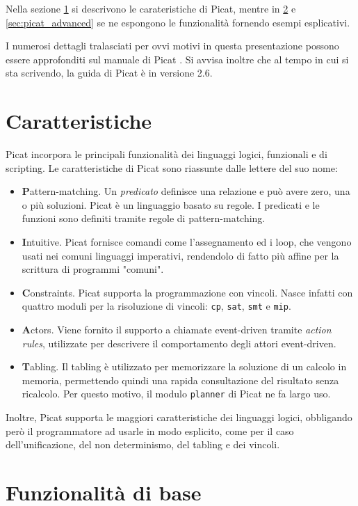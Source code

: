 \documentclass[12pt,a4paper,openright]{book} %
\begin{document}
Nella sezione \ref{sec:picat_features} si descrivono le carateristiche di Picat, mentre in \ref{sec:picat_base} e \ref{sec:picat_advanced} se ne espongono le funzionalità fornendo esempi esplicativi. 

I numerosi dettagli tralasciati per ovvi motivi in questa presentazione possono essere approfonditi sul manuale di Picat \cite{PicatGuide}. Si avvisa inoltre che al tempo in cui si sta scrivendo, la guida di Picat è in versione 2.6.

\section{Caratteristiche}
\label{sec:picat_features}

Picat incorpora le principali funzionalità dei linguaggi logici, funzionali e di scripting. Le caratteristiche di Picat sono riassunte dalle lettere del suo nome:
\begin{itemize}
\item \textbf{P}attern-matching. Un \emph{predicato} definisce una relazione e può avere zero, una o più soluzioni. Picat è un linguaggio basato su regole. I predicati e le funzioni sono definiti tramite regole di pattern-matching.
\item \textbf{I}ntuitive. Picat fornisce comandi come l'assegnamento ed i loop, che vengono usati nei comuni linguaggi imperativi, rendendolo di fatto più affine per la scrittura di programmi "comuni".
\item \textbf{C}onstraints. Picat supporta la programmazione con vincoli. Nasce infatti con quattro moduli per la risoluzione di vincoli: \verb|cp|, \verb|sat|, \verb|smt| e \verb|mip|.
\item \textbf{A}ctors. Viene fornito il supporto a chiamate event-driven tramite \emph{action rules}, utilizzate per descrivere il comportamento degli attori event-driven.
\item \textbf{T}abling. Il tabling è utilizzato per memorizzare la soluzione di un calcolo in memoria, permettendo quindi una rapida consultazione del risultato senza ricalcolo. Per questo motivo, il modulo \verb|planner| di Picat ne fa largo uso. 
\end{itemize}

Inoltre, Picat supporta le maggiori caratteristiche dei linguaggi logici, obbligando però il programmatore ad usarle in modo esplicito, come per il caso dell'unificazione, del non determinismo, del tabling e dei vincoli.

\section{Funzionalità di base}
\label{sec:picat_base}
\end{document}
